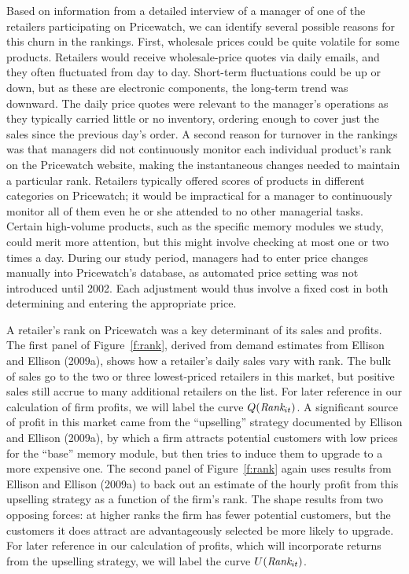 \documentclass[11pt]{article}
\newcommand{\Rank}{\mbox{\it Rank}}
\begin{document}
\begin{spacing}{1.3}
Based on information from a detailed interview of a manager of one of
the retailers participating on Pricewatch, we can identify several
possible reasons for this churn in the rankings. First, wholesale
prices could be quite volatile for some products. Retailers would
receive wholesale-price quotes via daily emails, and they often
fluctuated from day to day. Short-term fluctuations could be up or
down, but as these are electronic components, the long-term trend was
downward. The daily price quotes were relevant to the manager's
operations as they typically carried little or no inventory, ordering
enough to cover just the sales since the previous day's order. A
second reason for turnover in the rankings was that managers did not
continuously monitor each individual product's rank on the Pricewatch
website, making the instantaneous changes needed to maintain a
particular rank. Retailers typically offered scores of products in
different categories on Pricewatch; it would be impractical for a
manager to continuously monitor all of them even he or she attended to
no other managerial tasks. Certain high-volume products, such as the
specific memory modules we study, could merit more attention, but this
might involve checking at most one or two times a day. During our
study period, managers had to enter price changes manually into
Pricewatch's database, as automated price setting was not introduced
until 2002. Each adjustment would thus involve a fixed cost in both
determining and entering the appropriate price.

A retailer's rank on Pricewatch was a key determinant of its sales and
profits. The first panel of Figure~\ref{f:rank}, derived from demand
estimates from Ellison and Ellison (2009a), shows how a retailer's
daily sales vary with rank. The bulk of sales go to the two or three
lowest-priced retailers in this market, but positive sales still
accrue to many additional retailers on the list. For later reference
in our calculation of firm profits, we will label the curve
$Q(\Rank_{it})$.  A significant source of profit in this market came
from the ``upselling'' strategy documented by Ellison and Ellison
(2009a), by which a firm attracts potential customers with low prices
for the ``base'' memory module, but then tries to induce them to
upgrade to a more expensive one.  The second panel of
Figure~\ref{f:rank} again uses results from Ellison and Ellison
(2009a) to back out an estimate of the hourly profit from this
upselling strategy as a function of the firm's rank. The shape results
from two opposing forces: at higher ranks the firm has fewer potential
customers, but the customers it does attract are advantageously
selected be more likely to upgrade. For later reference in our
calculation of profits, which will incorporate returns from the
upselling strategy, we will label the curve $U(\Rank_{it})$.


\end{spacing}
\end{document}
